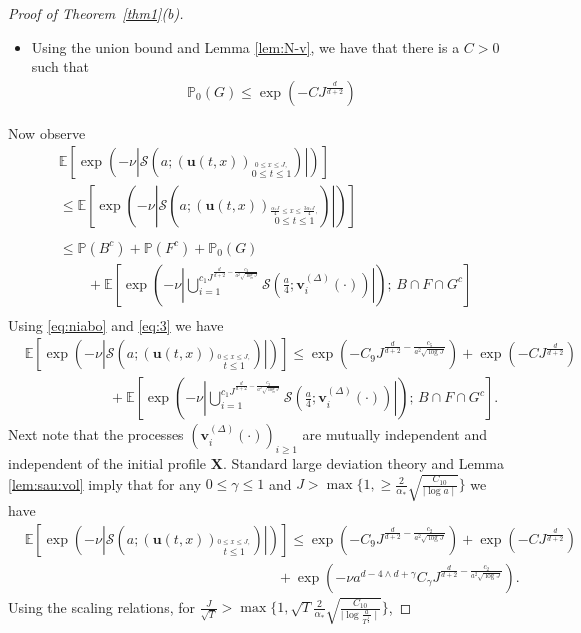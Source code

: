 \documentclass[12pt]{amsart}
\numberwithin{equation}{section}
\theoremstyle{definition}
\numberwithin{equation}{section}
\newcommand{\mP}{\mathbb{P}}
\newcommand{\X}{\mathbf{X}}
\newcommand{\E}{\mathbb{E}}
\newcommand{\uv}{\mathbf u}
\newcommand{\vv}{\mathbf v}
\begin{document}
\begin{proof}[Proof of Theorem~\ref{thm1}(\textup{b})]
\begin{itemize}
\item Using the union bound and Lemma \ref{lem:N-v}, we have that there is a $C>0$ such that
\begin{align}
  \label{eq:3}  \mP_0( G) \le \exp\left(-C J^{\frac{d}{d+2}}\right)
\end{align}
\end{itemize}
Now observe
\begin{align*}
  &  \E\left[\exp\left(-\nu\left| \mathcal{S}\left(a; \left(\uv(t,x)\right)_{\stackrel{ 0\le x\le J,}{0\le t\le 1}}\right)\right|\right)\right]
  \\ & \leq \E\left[\exp\left(-\nu\left| \mathcal{S}\left(a; \left(\uv(t,x)\right)_{\stackrel{\frac{\alpha_*J}{4} \le x\le \frac{3\alpha_*J}{4},}{0\le t\le 1}}\right)\right|\right)\right]\\
  &\\
  & \le \mP(B^c) + \mP(F^c) +\mP_0(G) \\
&\qquad + \E\left[\exp\left(- \nu \left|\bigcup_{i=1}^{c_1J^{\frac{d}{d+2} -\frac{c_2}{a^2 \sqrt{\log J} }}}\mathcal S\left(\frac{a}{4}; \vv_i^{(\Delta)}(\cdot)\right) \right|\right); \, B \cap F \cap G^c\right] \nonumber\\
\end{align*}
Using \eqref{eq:niabo} and \eqref{eq:3} we have
\begin{align*}
&\E\left[\exp\left(-\nu\left| \mathcal{S}\left(a; \left(\uv(t,x)\right)_{\stackrel{ 0\le x\le J,}{t\le 1}}\right)\right|\right)\right] \le \exp\left(-C_9 J^{\frac{d}{d+2} -\frac{c_5}{a^2 \sqrt{\log J} }}\right) + \exp\left(-C J^{\frac{d}{d+2}}\right) \nonumber\\
  & \hspace{1in} + \E\left[\exp\left(- \nu \left|\bigcup_{i=1}^{c_1 
J^{\frac{d}{d+2} -\frac{c_2}{a^2 \sqrt{\log J} }}}\mathcal 
S\left(\frac{a}{4}; \vv_i^{(\Delta)}(\cdot)\right) \right|\right); \, B \cap F \cap G^c\right].   \nonumber
\end{align*}
Next note that the processes $\left(\vv_i^{(\Delta)}(\cdot)\right)_{i\ge 1}$ are mutually independent and independent of the initial profile $\X$. Standard large deviation theory and Lemma \ref{lem:sau:vol} imply that  for any $0 \leq  \gamma \leq 1$ and $J > \max\{1, \geq \frac{2}{\alpha_*} \sqrt{\frac{C_{10}}{\mid \log a \mid } }\}$ we have 
\begin{align*}
  &\E\left[\exp\left(-\nu\left| \mathcal{S}\left(a; \left(\uv(t,x)\right)_{\stackrel{ 0\le x\le J,}{t\le 1}}\right)\right|\right)\right] \le \exp\left(-C_9J^{\frac{d}{d+2} -\frac{c_2}{a^2 \sqrt{\log J} }}\right) + \exp\left(-C J^{\frac{d}{d+2}}\right) \nonumber\\
  & \hspace{3in} + \exp\left(-\nu a^{d-4\wedge d +\gamma} C_\gamma J^{\frac{d}{d+2} -\frac{c_2}{a^2 \sqrt{\log J} }} \right).
\end{align*}
Using the scaling relations, for {$\frac{J}{\sqrt{T}} > \max\{1, \sqrt{T}\frac{2}{\alpha_*} \sqrt{\frac{C_{10}}{\mid \log {\frac{a}{T^{\frac14}}} \mid} }\}$}, 


\end{proof}
\end{document}
